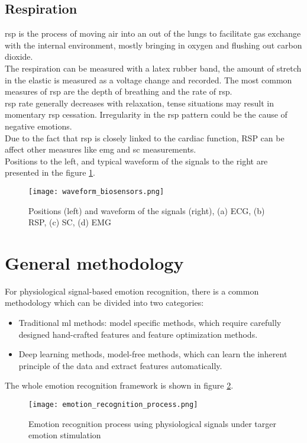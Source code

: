 \subsection{Respiration}
\gls{rsp} is the process of moving air into an out of the lungs to facilitate gas exchange with the internal environment, mostly bringing in oxygen and flushing out carbon dioxide.
\\
The respiration can be measured with a latex rubber band, the amount of stretch in the elastic is measured as a voltage change and recorded. The most common measures of \gls{rsp} are the depth of breathing and the rate of \gls{rsp}.
\\ \indent
\gls{rsp} rate generally decreases with relaxation, tense situations may result in momentary \gls{rsp} cessation. Irregularity in the \gls{rsp} pattern could be the cause of negative emotions.
\\
Due to the fact that \gls{rsp} is closely linked to the cardiac function, RSP can be affect other measures like \gls{emg} and \gls{sc} measurements.
\\
Positions to the left, and typical waveform of the signals to the right are presented in the figure \ref{fig:waveform_biosensors}.
\begin{figure}[h]
    \centering
    \texttt{[image: waveform\_biosensors.png]} 
	\caption{Positions (left) and waveform of the signals (right), (a) ECG, (b) RSP, (c) SC, (d) EMG}
    \label{fig:waveform_biosensors}
\end{figure}

\section{General methodology}
For physiological signal-based emotion recognition, there is a common methodology which can be divided into two categories:
\begin{itemize}
	\item Traditional \gls{ml} methods: model specific methods, which require carefully designed hand-crafted features and feature optimization methods.
	\item Deep learning methods, model-free methods, which can learn the inherent principle of the data and extract features automatically.
\end{itemize}
The whole emotion recognition framework is shown in figure \ref{fig:emotion_recognition_process}.
\begin{figure}[h]
    \centering
    \texttt{[image: emotion\_recognition\_process.png]} 
	\caption{Emotion recognition process using physiological signals under targer emotion stimulation}
    \label{fig:emotion_recognition_process}
\end{figure}

